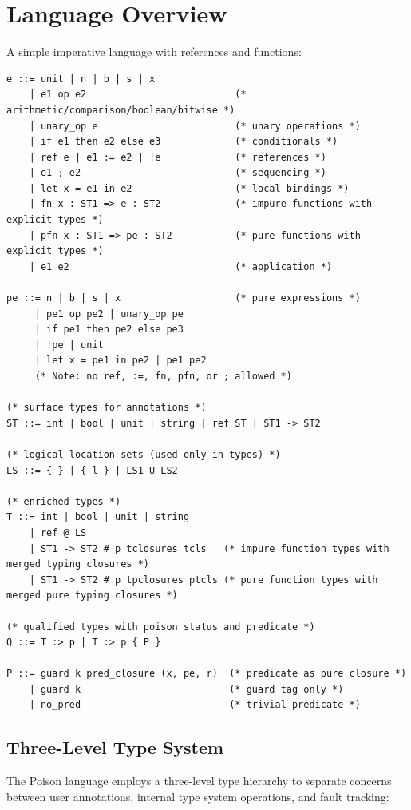 \documentclass[12pt]{article}
\begin{document}
\section{Language Overview}

A simple imperative language with references and functions:

\begin{lstlisting}[language=poison]
e ::= unit | n | b | s | x
    | e1 op e2                          (* arithmetic/comparison/boolean/bitwise *)
    | unary_op e                        (* unary operations *)
    | if e1 then e2 else e3             (* conditionals *)
    | ref e | e1 := e2 | !e             (* references *)
    | e1 ; e2                           (* sequencing *)
    | let x = e1 in e2                  (* local bindings *)
    | fn x : ST1 => e : ST2             (* impure functions with explicit types *)
    | pfn x : ST1 => pe : ST2           (* pure functions with explicit types *)
    | e1 e2                             (* application *)

pe ::= n | b | s | x                    (* pure expressions *)
     | pe1 op pe2 | unary_op pe
     | if pe1 then pe2 else pe3
     | !pe | unit
     | let x = pe1 in pe2 | pe1 pe2
     (* Note: no ref, :=, fn, pfn, or ; allowed *)

(* surface types for annotations *)     
ST ::= int | bool | unit | string | ref ST | ST1 -> ST2  

(* logical location sets (used only in types) *)
LS ::= { } | { l } | LS1 U LS2

(* enriched types *)
T ::= int | bool | unit | string
    | ref @ LS
    | ST1 -> ST2 # p tclosures tcls   (* impure function types with merged typing closures *)
    | ST1 -> ST2 # p tpclosures ptcls (* pure function types with merged pure typing closures *)

(* qualified types with poison status and predicate *)    
Q ::= T :> p | T :> p { P }      

P ::= guard k pred_closure (x, pe, r)  (* predicate as pure closure *)
    | guard k                          (* guard tag only *)
    | no_pred                          (* trivial predicate *)
\end{lstlisting}

\subsection{Three-Level Type System}

The Poison language employs a three-level type hierarchy to separate concerns
between user annotations, internal type system operations, and fault tracking:
\end{document}
